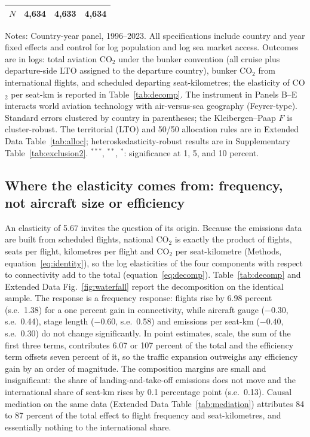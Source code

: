 \documentclass[12pt]{article}
\begin{document}
\begin{table}[H]
{\begin{threeparttable}
\begin{tabular}{lccc}
  $N$ & 4,634 & 4,633 & 4,634 \\
\bottomrule
\end{tabular}
\begin{tablenotes}[flushleft]
\footnotesize
\item Notes: Country-year panel, 1996--2023. All specifications include country and year fixed effects and control for log population and log sea market access. Outcomes are in logs: total aviation CO$_2$ under the bunker convention (all cruise plus departure-side LTO assigned to the departure country), bunker CO$_2$ from international flights, and scheduled departing seat-kilometres; the elasticity of CO$_2$ per seat-km is reported in Table~\ref{tab:decomp}. The instrument in Panels B--E interacts world aviation technology with air-versus-sea geography (Feyrer-type). Standard errors clustered by country in parentheses; the Kleibergen--Paap $F$ is cluster-robust. The territorial (LTO) and 50/50 allocation rules are in Extended Data Table~\ref{tab:alloc}; heteroskedasticity-robust results are in Supplementary Table~\ref{tab:exclusion2}. $^{***}$, $^{**}$, $^{*}$: significance at 1, 5, and 10 percent.
\end{tablenotes}
\end{threeparttable}}
\end{table}

\subsection*{Where the elasticity comes from: frequency, not aircraft size
or efficiency}
An elasticity of 5.67 invites the question of its origin. Because the
emissions data are built from scheduled flights, national CO$_2$ is
exactly the product of flights, seats per flight, kilometres per flight and
CO$_2$ per seat-kilometre (Methods, equation~\ref{eq:identity}), so the
log elasticities of the four components with respect to connectivity add
to the total (equation~\ref{eq:decomp}). Table~\ref{tab:decomp} and Extended Data
Fig.~\ref{fig:waterfall} report the decomposition on the identical sample.
The response is a frequency response: flights rise by 6.98 percent (s.e.\
1.38) for a one percent gain in connectivity, while aircraft gauge
($-0.30$, s.e.\ 0.44), stage length ($-0.60$, s.e.\ 0.58) and emissions
per seat-km ($-0.40$, s.e.\ 0.30) do not change significantly. In point
estimates, scale, the sum of the first three terms, contributes 6.07 or
107 percent of the total and the efficiency term offsets seven percent of
it, so the traffic expansion outweighs any efficiency gain by an order of
magnitude. The composition margins are small and insignificant: the share
of landing-and-take-off emissions does not move and the international
share of seat-km rises by 0.1 percentage point (s.e.\ 0.13). Causal
mediation on the same data (Extended Data Table~\ref{tab:mediation})
attributes 84 to 87 percent of the total effect to flight frequency and
seat-kilometres, and essentially nothing to the international share.
\end{document}
